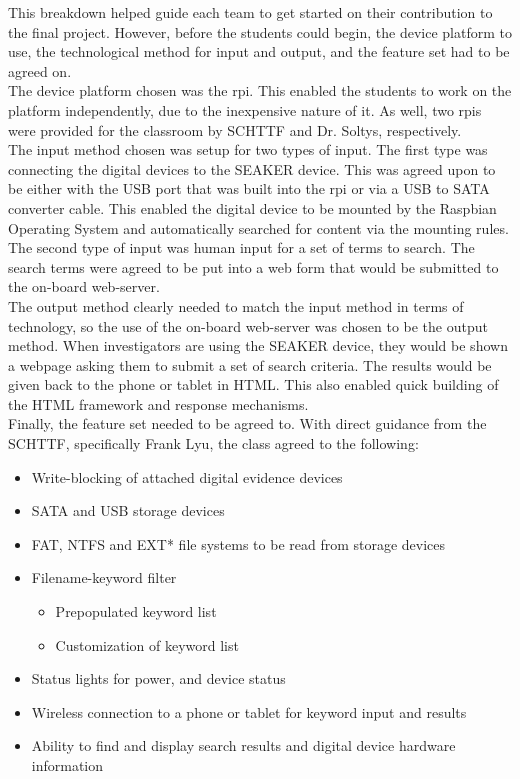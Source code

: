 \documentclass[12pt]{article}
\begin{document}
This breakdown helped guide each team to get started on their contribution to the
final project.  However, before the students could begin, the device platform to use,
the technological method for input and output, and the feature set had to be agreed on.\\

The device platform chosen was the \gls{rpi}.  This enabled the students to work on the platform
independently, due to the inexpensive nature of it.  As well, two \glspl{rpi} were provided
for the classroom by SCHTTF and Dr. Soltys, respectively.\\

The input method chosen was setup for two types of input.  The first type was connecting
the digital devices to the SEAKER device.  This was agreed upon to be either with the USB
port that was built into the \gls{rpi} or via a USB to SATA converter cable.  This enabled
the digital device to be mounted by the Raspbian Operating System and automatically 
searched for content via the mounting rules.  The second type of input was human input
for a set of terms to search.  The search terms were agreed to be put into a web form that
would be submitted to the on-board web-server.\\

The output method clearly needed to match the input method in terms of technology, so the
use of the on-board web-server was chosen to be the output method.  When investigators are
using the SEAKER device, they would be shown a webpage asking them to submit a 
set of search criteria.  The results would be given back to the phone or tablet in HTML.
This also enabled quick building of the HTML framework and response mechanisms.\\

Finally, the feature set needed to be agreed to.  With direct guidance from the SCHTTF,
specifically Frank Lyu, the class agreed to the following:

\begin{itemize}
  \item Write-blocking of attached digital evidence devices
  \item SATA and USB storage devices
  \item FAT, NTFS and EXT* file systems to be read from storage devices
  \item Filename-keyword filter
  \begin{itemize}
    \item Prepopulated keyword list
    \item Customization of keyword list
  \end{itemize}
  \item Status lights for power, and device status
  \item Wireless connection to a phone or tablet for keyword input and results
  \item Ability to find and display search results and digital device hardware information
\end{itemize}
\end{document}
